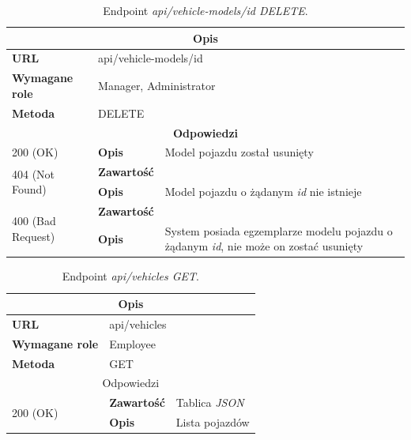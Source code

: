 \documentclass[eng,printmode,openany]{mgr}
\begin{document}
\begin{table}[H]
	\caption{Endpoint \textit{api/vehicle-models/id DELETE}.}
	\begin{tabularx}{\textwidth}{|l|l|X|}
		\hline
		\multicolumn{3}{|c|}{\textbf{\textbf{Opis}}}
		\\ \hline
		\textbf{URL}                       & \multicolumn{2}{l|}{api/vehicle-models/id}
		\\ \hline
		\textbf{Wymagane role}             & \multicolumn{2}{l|}{Manager, Administrator}
		\\ \hline
		\textbf{Metoda}                    & \multicolumn{2}{l|}{DELETE}
		\\ \hline
		\multicolumn{3}{|c|}{\textbf{Odpowiedzi}}
		\\ \hline
		200 (OK)			                & \textbf{Opis}         	& Model pojazdu został usunięty
		\\ \hline
		\multirow{2}{*}{404 (Not Found)} 	& \textbf{Zawartość}     &    	
		\\ \cline{2-3}                      & \textbf{Opis}          & Model pojazdu o żądanym \textit{id} nie istnieje
		\\ \hline
		\multirow{2}{*}{400 (Bad Request)} 	& \textbf{Zawartość}     &    	
		\\ \cline{2-3}                      & \textbf{Opis}          & System posiada egzemplarze modelu pojazdu o żądanym \textit{id}, nie może on zostać usunięty
		\\ \hline
	\end{tabularx}
\end{table}

\begin{table}[H]
	\caption{Endpoint \textit{api/vehicles GET}.}
	\begin{tabularx}{\textwidth}{|l|l|X|}
		\hline
		\multicolumn{3}{|c|}{\textbf{\textbf{Opis}}}
		\\ \hline
		\textbf{URL}                         & \multicolumn{2}{l|}{api/vehicles}
		\\ \hline
		\textbf{Wymagane role}               & \multicolumn{2}{l|}{Employee}
		\\ \hline
		\textbf{Metoda}                      & \multicolumn{2}{l|}{GET}
		\\ \hline
		\multicolumn{3}{|c|}{ Odpowiedzi}
		\\ \hline
		\multirow{2}{*}{200 (OK)}   & \textbf{Zawartość}         & Tablica \textit{JSON}
		\\ \cline{2-3}              & \textbf{Opis}         	    & Lista pojazdów
		\\ \hline
	\end{tabularx}
\end{table}
\end{document}
